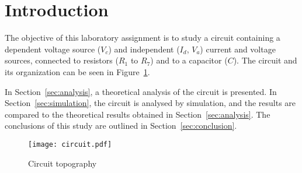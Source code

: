 \section{Introduction}
\label{sec:introduction}

\tab The objective of this laboratory assignment is to study a circuit containing a dependent voltage source ($V_c$) and independent ($I_d$, $V_a$) current and voltage sources, connected to resistors ($R_1$ to $R_7$) and to a capacitor ($C$).
The circuit and its organization can be seen in Figure~\ref{fig:circuit}.

In Section~\ref{sec:analysis}, a theoretical analysis of the circuit is
presented. In Section~\ref{sec:simulation}, the circuit is analysed by
simulation, and the results are compared to the theoretical results obtained in
Section~\ref{sec:analysis}. The conclusions of this study are outlined in
Section~\ref{sec:conclusion}.
\\[1cm]
\begin{figure}[h] \centering
\texttt{[image: circuit.pdf]}
\caption{Circuit topography}
\label{fig:circuit}
\end{figure}

